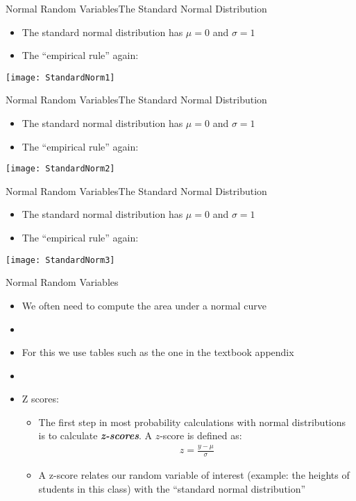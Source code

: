 \documentclass[xcolor=dvipsnames]{beamer}
\begin{document}
\begin{frame}{Normal Random Variables}{The Standard Normal Distribution}
	\begin{itemize}
		\item The standard normal distribution has $\mu = 0$ and $\sigma = 1$ \pause
		\item The ``empirical rule'' again: \pause
	\end{itemize}
\begin{center}
	\texttt{[image: StandardNorm1]}
\end{center}
\end{frame}

\begin{frame}{Normal Random Variables}{The Standard Normal Distribution}
	\begin{itemize}
		\item The standard normal distribution has $\mu = 0$ and $\sigma = 1$
		\item The ``empirical rule'' again:
	\end{itemize}
	\begin{center}
		\texttt{[image: StandardNorm2]}
	\end{center}
\end{frame}

\begin{frame}{Normal Random Variables}{The Standard Normal Distribution}
	\begin{itemize}
		\item The standard normal distribution has $\mu = 0$ and $\sigma = 1$
		\item The ``empirical rule'' again:
	\end{itemize}
	\begin{center}
		\texttt{[image: StandardNorm3]}
	\end{center}
\end{frame}

\begin{frame}{Normal Random Variables}
	\begin{itemize}
		\item We often need to compute the area under a normal curve \pause
		\item[]
		\item For this we use tables such as the one in the textbook appendix \pause
		\item[]
		\item Z scores: \pause
		\begin{itemize}
			\item The first step in most probability calculations with normal distributions is to calculate \textbf{\emph{z-scores}}. A $z$-score is defined as: \pause
			\begin{gather*}
			z = \frac{y-\mu}{\sigma}
			\end{gather*}
			\item A z-score relates our random variable of interest (example: the heights of students in this class) with the ``standard normal distribution''
		\end{itemize}
	\end{itemize}
\end{frame}
\end{document}
